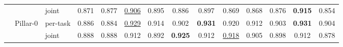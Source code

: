 \begin{tabular}{@{}lllccccccccccc@{}}
 &  & joint & \cellcolor{modebest}0.871 & \cellcolor{modebest}0.877 & \cellcolor{modebest}\underline{0.906} & \cellcolor{modebest}0.895 & 0.886 & 0.897 & 0.869 & 0.868 & 0.876 & \cellcolor{modebest}\textbf{0.915} & 0.854 \\
\addlinespace[1.5pt]
 & Pillar-0 & per-task & 0.886 & 0.884 & \cellcolor{modebest}\underline{0.929} & \cellcolor{modebest}0.914 & 0.902 & \cellcolor{modebest}\textbf{0.931} & \cellcolor{modebest}0.920 & \cellcolor{modebest}0.912 & \cellcolor{modebest}0.903 & \cellcolor{modebest}\textbf{0.931} & \cellcolor{modebest}0.904 \\
 &  & joint & \cellcolor{modebest}0.888 & \cellcolor{modebest}0.888 & 0.912 & 0.892 & \cellcolor{modebest}\textbf{0.925} & 0.912 & \underline{0.918} & 0.905 & 0.898 & 0.912 & 0.878 \\
\bottomrule
\end{tabular}
